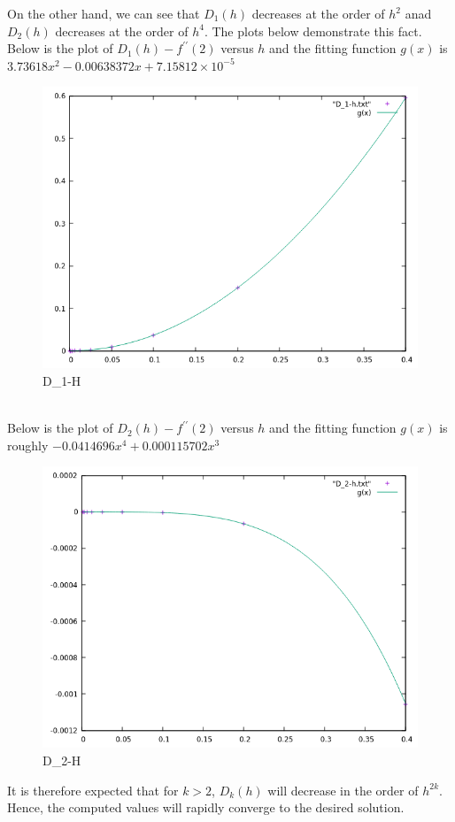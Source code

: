 \documentclass[12pt,a4paper]{article}
\begin{document}
On the other hand, we can see that $D_{1}(h)$ decreases at the order of $h^{2}$ anad $D_{2}(h)$ decreases at the order of $h^{4}$. The plots below demonstrate this fact.\\
Below is the plot of $D_{1}(h) - f^{\prime \prime}(2)$ versus $h$ and the fitting function $g(x)$ is  $3.73618x^{2}-0.00638372x+7.15812\times 10^{-5}$\\
\begin{figure}[htpb]
    \centering
    \includegraphics[width=0.5\linewidth]{D_1-h.png}
    \caption{D_1-H}%
    \label{fig:D_1-h}
\end{figure}\\

\newpage
Below is the plot of $D_{2}(h) - f^{\prime \prime}(2)$ versus $h$ and the fitting function $g(x)$ is  roughly $-0.0414696x^{4}+0.000115702x^{3}$

\begin{figure}[htpb]
    \centering
    \includegraphics[width=0.5\linewidth]{D_2-h.png}
    \caption{D_2-H}%
    \label{fig:D_2-h}
\end{figure}

It is therefore expected that for $k >2$, $D _{k}(h)$ will decrease in the order of $h^{2k}$. Hence, the computed values will rapidly converge to the desired solution.
\end{document}
